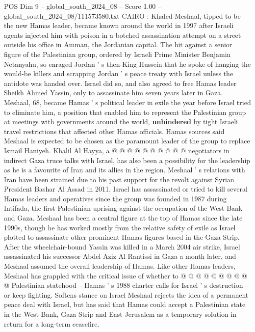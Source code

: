 \begin{textsample}{POS Dim 9 – global\_south\_2024\_08 – Score 1.00 – global\_south\_2024\_08/111573580.txt}  \label{ex:f9_pos_116}
CAIRO : Khaled Meshaal, tipped to be the new Hamas leader, became known around the world in 1997 after Israeli agents injected him with poison in a botched assassination attempt on a street outside his office in Amman, the Jordanian capital.
The hit against a senior figure of the Palestinian group, ordered by Israeli Prime Minister Benjamin Netanyahu, so enraged Jordan ' s then-King Hussein that he spoke of hanging the would-be killers and scrapping Jordan ' s peace treaty with Israel unless the antidote was handed over.
Israel did so, and also agreed to free Hamas leader Sheikh Ahmed Yassin, only to assassinate him seven years later in Gaza.
Meshaal, 68, became Hamas ' s political leader in exile the year before Israel tried to eliminate him, a position that enabled him to represent the Palestinian group at meetings with governments around the world, \textbf{unhindered} by tight Israeli travel restrictions that affected other Hamas officials.
Hamas sources said Meshaal is expected to be chosen as the paramount leader of the group to replace Ismail Haniyeh.
Khalil Al Hayya, a @ @ @ @ @ @ @ @ @ @ negotiators in indirect Gaza truce talks with Israel, has also been a possibility for the leadership as he is a favourite of Iran and its allies in the region.
Meshaal ' s relations with Iran have been strained due to his past support for the revolt against Syrian President Bashar Al Assad in 2011.
Israel has assassinated or tried to kill several Hamas leaders and operatives since the group was founded in 1987 during Intifada, the first Palestinian uprising against the occupation of the West Bank and Gaza.
Meshaal has been a central figure at the top of Hamas since the late 1990s, though he has worked mostly from the relative safety of exile as Israel plotted to assassinate other prominent Hamas figures based in the Gaza Strip.
After the wheelchair-bound Yassin was killed in a March 2004 air strike, Israel assassinated his successor Abdel Aziz Al Rantissi in Gaza a month later, and Meshaal assumed the overall leadership of Hamas.
Like other Hamas leaders, Meshaal has grappled with the critical issue of whether to @ @ @ @ @ @ @ @ @ @ Palestinian statehood -- Hamas ' s 1988 charter calls for Israel ' s destruction -- or keep fighting.
Softens stance on Israel Meshaal rejects the idea of a permanent peace deal with Israel, but has said that Hamas could accept a Palestinian state in the West Bank, Gaza Strip and East Jerusalem as a temporary solution in return for a long-term ceasefire.

\end{textsample}
